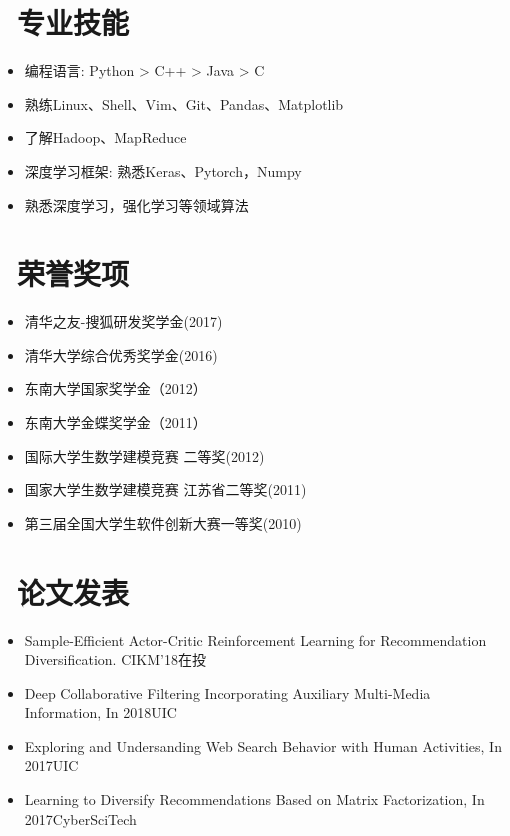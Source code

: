 \documentclass{resume}
\begin{document}
\section{\faCogs\ 专业技能}
\begin{itemize}[parsep=0.5ex]
  \item 编程语言: Python > C++ > Java > C
  \item 熟练Linux、Shell、Vim、Git、Pandas、Matplotlib
  \item 了解Hadoop、MapReduce
  \item 深度学习框架: 熟悉Keras、Pytorch，Numpy
  \item 熟悉深度学习，强化学习等领域算法
\end{itemize}

\section{\faCogs\ 荣誉奖项}
\begin{itemize}[parsep=0.5ex]
	\item 清华之友-搜狐研发奖学金(2017)
	\item 清华大学综合优秀奖学金(2016) 
	\item 东南大学国家奖学金（2012）
	\item 东南大学金蝶奖学金（2011）
	\item 国际大学生数学建模竞赛 二等奖(2012)
	\item 国家大学生数学建模竞赛 江苏省二等奖(2011)
	\item 第三届全国大学生软件创新大赛一等奖(2010)

\end{itemize}

\section{\faBook\ 论文发表}
\begin{itemize}
	\item Sample-Efficient Actor-Critic Reinforcement Learning for Recommendation Diversification. CIKM'18在投
	\item Deep Collaborative Filtering Incorporating Auxiliary Multi-Media Information, In 2018UIC
	\item Exploring and Undersanding Web Search Behavior with Human Activities, In 2017UIC
	\item Learning to Diversify Recommendations Based on Matrix Factorization, In 2017CyberSciTech
\end{itemize}

%
%
\end{document}
